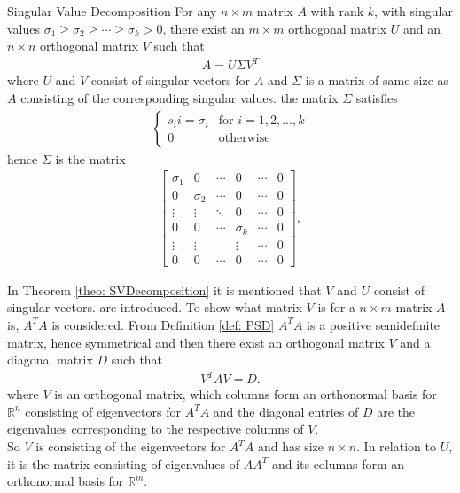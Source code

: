 \begin{theorem}{Singular Value Decomposition}
    For any $n \times m$ matrix $A$ with rank $k$, with singular values $\sigma_1 \geq \sigma_2 \geq \cdots \geq \sigma_k > 0$, there exist an $m\times m$ orthogonal matrix $U$ and an $n\times n$ orthogonal matrix $V$ such that 
    \begin{align*}
        A=U\Sigma V^T
    \end{align*}
    where $U$ and $V$ consist of singular vectors for $A$ and $\Sigma$ is a matrix of same size as $A$ consisting of the corresponding singular values. the matrix $\Sigma$ satisfies 
    \begin{align*}
            \begin{cases}
          s_ii = \sigma_i & \text{for } i =1, 2,...,k\\
          0 & \text{otherwise}
    \end{cases}
    \end{align*}
    hence $\Sigma$ is the matrix 
    \begin{align*}
        \begin{bmatrix}
           \sigma_1 & 0 & \cdots & 0 & \cdots & 0\\
           0 & \sigma_2 & \cdots & 0 & \cdots & 0\\
           \vdots & \vdots & \ddots & 0 & \cdots & 0\\
           0 & 0 & \cdots & \sigma_k & \cdots & 0\\
           \vdots & \vdots & & \vdots & \cdots & 0\\
           0 & 0 & \cdots & 0 & \cdots & 0
        \end{bmatrix},
    \end{align*}
    \label{theo: SVDecomposition}
\end{theorem}
    \noindent In Theorem \ref{theo: SVDecomposition} it is mentioned that $V$ and $U$ consist of singular vectors.
    are introduced. To show what matrix $V$ is for a $n \times m$ matrix $A$ is, $A^TA$ is considered. From Definition \ref{def: PSD} $A^TA$ is a positive semidefinite matrix, hence symmetrical and then there exist an orthogonal matrix $V$ and a diagonal matrix $D$ such that 
    \begin{align*}
        V^TAV = D.    
    \end{align*}
    where $V$ is an orthogonal matrix, which columns form an orthonormal basis for $\mathbb{R}^n$ consisting of eigenvectors for $A^TA$ and the diagonal entries of $D$ are the eigenvalues corresponding to the respective columns of $V$\cite[426]{LiAl}.\\ 
    So $V$ is consisting of the eigenvectors for $A^TA$ and has size $n \times n$. In relation to $U$, it is the matrix consisting of eigenvalues of $AA^T$ and its columns form an orthonormal basis for $\mathbb{R}^m$.

